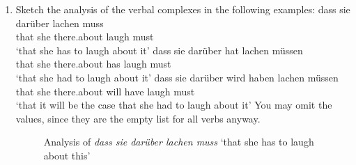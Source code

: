 \begin{enumerate}
\item Sketch the analysis of the verbal complexes in the following examples:
\eal
\ex
\gll dass sie darüber lachen muss\\
     that she there.about laugh must\\\german
\glt `that she has to laugh about it' 
\ex 
\gll dass sie darüber hat lachen müssen\\
     that she there.about has laugh  must\\
\glt `that she had to laugh about it' 
\ex 
\gll dass sie darüber     wird haben lachen müssen\\
     that she there.about will have  laugh  must\\
\glt `that it will be the case that she had to laugh about it'
\zl
You may omit the \spr values, since they are the empty list for all  verbs anyway.


\begin{figure}
\caption{Analysis of \emph{dass sie darüber lachen muss} `that she has to laugh about this'}
\end{figure}



\end{enumerate}
